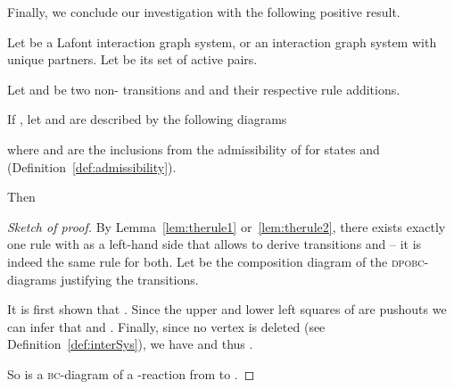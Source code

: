Finally, we conclude our investigation with the following  positive  result. 
\begin{theorem}[Compositionality]
  Let  be a Lafont interaction graph system, 
  or an interaction graph system with unique partners.
  Let  be its set of active pairs.
  
  Let  and  be two non- transitions and  and   their respective rule additions.

  
  If ,  let  and  are described by  the following  diagrams

where  and  are the inclusions from the admissibility  of  for states  and  (Definition~\ref{def:admissibility}).

  Then 
\end{theorem}
\begin{proof}[Sketch of proof]
  By Lemma~\ref{lem:therule1} or~\ref{lem:therule2}, 
  there exists exactly one rule  with  as a left-hand side that allows to derive transitions  and  -- 
  it is indeed the same rule for both. 
  Let  be the composition diagram of the
  \textsc{dpobc}-diagrams justifying the transitions.


  It is first shown that . 
  Since the upper and lower left squares of  are pushouts
  we can infer that   and .
  Finally, since no vertex is deleted (see Definition~\ref{def:interSys}),
  we have   and thus .

  So  is a \textsc{bc}-diagram of a -reaction from  to .

\end{proof}



